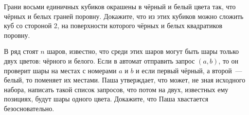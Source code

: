 \begin{problems}
\item Грани восьми единичных кубиков окрашены в чёрный и белый цвета так, что чёрных и белых граней поровну. Докажите, что из этих кубиков можно сложить куб со стороной 2, на поверхности которого чёрных и белых квадратиков поровну.

\item В ряд стоят $n$ шаров, известно, что среди этих шаров могут быть шары только двух цветов: чёрного и белого. Если в автомат отправить запрос $(a, b)$, то он проверит шары на местах с номерами $a$ и $b$ и если первый чёрный, а второй~--- белый, то поменяет их местами. Паша утверждает, что может, не зная исходного набора, написать такой список запросов, что потом на двух, известных ему позициях, будут шары одного цвета. Докажите, что Паша хвастается безосновательно.  


\end{problems}

\renewcommand{\baselinestretch}{1}
\parskip
